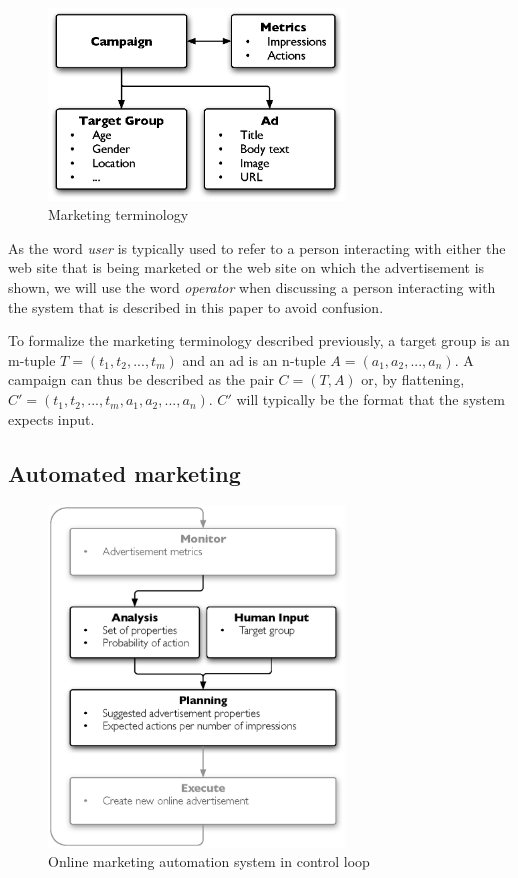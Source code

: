 \documentclass[a4paper]{article}
\begin{document}
\begin{figure}[htb] \centering \includegraphics[width=0.7\textwidth]{campaign-terminology.eps}
	\caption{Marketing terminology}
	\label{fig:MarketingTerminology}
\end{figure}

As the word \emph{user} is typically used to refer to a person interacting with either the web site that is being marketed or the web site on which the advertisement is shown, we will use the word \emph{operator} when discussing a person interacting with the system that is described in this paper to avoid confusion.

To formalize the marketing terminology described previously, a target group is an m-tuple \(T = (t_1, t_2, ..., t_m)\) and an ad is an n-tuple \(A = (a_1, a_2, ..., a_n)\). A campaign can thus be described as the pair \(C = (T, A)\) or, by flattening, \(C' = (t_1, t_2, ..., t_m, a_1, a_2, ..., a_n)\). \(C'\) will typically be the format that the system expects input.


\subsection{Automated marketing}
\begin{figure}[htb] \centering \includegraphics[width=0.7\textwidth]{mape-marketing.eps}
	\caption{Online marketing automation system in control loop}
	\label{fig:MAPEMarketing}
\end{figure}
\end{document}
